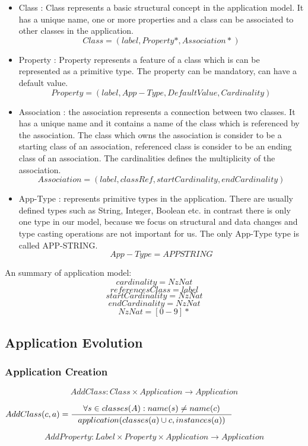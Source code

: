 \documentclass[11pt]{article}
\begin{document}
\begin{itemize}
	\item Class : Class represents a basic structural concept in the application model. It has a unique name, one or more properties and a class can be associated to other classes in the application.  
$$
Class = (label, Property*, Association*)
$$
	\item Property : Property represents a feature of  a class which is can be represented as a primitive type. The property can be mandatory, can have a default value.
$$
Property = (label, App-Type, DefaultValue, Cardinality)
$$
	\item Association : the association represents a connection between two classes. It has a unique name and it contains a name of the class which is referenced by the association. The class which owns the association is consider to be a starting class of an association, referenced class is consider to be an ending class of an association. The cardinalities defines the multiplicity of the association.
$$
Association = (label, classRef, startCardinality, endCardinality)
$$
	\item App-Type : represents primitive types in the application. There are usually defined types such as String, Integer, Boolean etc. in contrast there is only one type in our model, because we focus on structural and data changes and type casting operations are not important for us. The only App-Type type is called APP-STRING.
$$
App-Type = APPSTRING
$$
\end{itemize}
An summary of application model:
$$
cardinality = NzNat
$$
$$
referencesClass = label
$$
$$
startCardinality = NzNat
$$
$$
endCardinality = NzNat
$$
$$
NzNat = [0 - 9]*
$$

\subsection{Application Evolution}
\label{sec:appEvolution}
\subsubsection{Application Creation}
$$AddClass: Class \times Application \rightarrow Application $$

$
AddClass(c, a) = \inference{\forall s \in classes(A) : name(s) \neq name(c)}
{application(classes(a) \cup c, instances(a))}
$

$$AddProperty : Label \times Property \times Application \rightarrow Application $$
\end{document}
